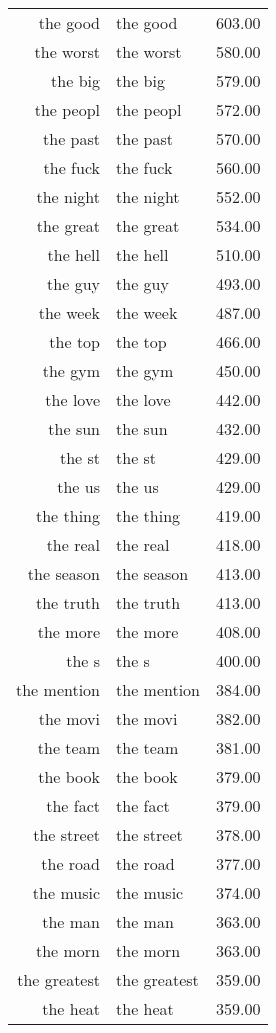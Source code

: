 \begin{table}[ht]
\begin{tabular}{rlr}
  the good & the good & 603.00 \\ 
  the worst & the worst & 580.00 \\ 
  the big & the big & 579.00 \\ 
  the peopl & the peopl & 572.00 \\ 
  the past & the past & 570.00 \\ 
  the fuck & the fuck & 560.00 \\ 
  the night & the night & 552.00 \\ 
  the great & the great & 534.00 \\ 
  the hell & the hell & 510.00 \\ 
  the guy & the guy & 493.00 \\ 
  the week & the week & 487.00 \\ 
  the top & the top & 466.00 \\ 
  the gym & the gym & 450.00 \\ 
  the love & the love & 442.00 \\ 
  the sun & the sun & 432.00 \\ 
  the st & the st & 429.00 \\ 
  the us & the us & 429.00 \\ 
  the thing & the thing & 419.00 \\ 
  the real & the real & 418.00 \\ 
  the season & the season & 413.00 \\ 
  the truth & the truth & 413.00 \\ 
  the more & the more & 408.00 \\ 
  the s & the s & 400.00 \\ 
  the mention & the mention & 384.00 \\ 
  the movi & the movi & 382.00 \\ 
  the team & the team & 381.00 \\ 
  the book & the book & 379.00 \\ 
  the fact & the fact & 379.00 \\ 
  the street & the street & 378.00 \\ 
  the road & the road & 377.00 \\ 
  the music & the music & 374.00 \\ 
  the man & the man & 363.00 \\ 
  the morn & the morn & 363.00 \\ 
  the greatest & the greatest & 359.00 \\ 
  the heat & the heat & 359.00 \\ 

\end{tabular}
\end{table}
